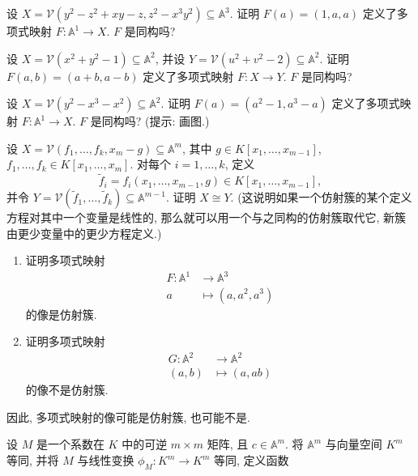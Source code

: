 \BookExerciseHeading
\begin{BookExercises}
  \item\label{ex:polynomial-map-to-two-equation-variety} 设 $X=\mathcal{V}(y^{2}-z^{2}+xy-z,z^{2}-x^{3}y^{2})\subseteq\mathbb{A}^{3}$. 证明 $F(a)=(1,a,a)$ 定义了多项式映射 $F:\mathbb{A}^{1}\to X$. $F$ 是同构吗?
  \item\label{ex:polynomial-map-between-two-circles} 设 $X=\mathcal{V}(x^{2}+y^{2}-1)\subseteq\mathbb{A}^{2}$, 并设 $Y=\mathcal{V}(u^{2}+v^{2}-2)\subseteq\mathbb{A}^{2}$. 证明 $F(a,b)=(a+b,a-b)$ 定义了多项式映射 $F:X\to Y$. $F$ 是同构吗?
  \item\label{ex:polynomial-map-to-nodal-cubic} 设 $X=\mathcal{V}(y^{2}-x^{3}-x^{2})\subseteq\mathbb{A}^{2}$. 证明 $F(a)=(a^{2}-1,a^{3}-a)$ 定义了多项式映射 $F:\mathbb{A}^{1}\to X$. $F$ 是同构吗? (提示: 画图.)
  \item\label{ex:eliminate-a-linear-coordinate} 设 $X=\mathcal{V}(f_{1},\ldots,f_{k},x_{m}-g)\subseteq\mathbb{A}^{m}$, 其中 $g\in K[x_{1},\ldots,x_{m-1}]$, $f_{1},\ldots,f_{k}\in K[x_{1},\ldots,x_{m}]$. 对每个 $i=1,\ldots,k$, 定义
    \[
      \widetilde{f}_{i}=f_{i}(x_{1},\ldots,x_{m-1},g)\in K[x_{1},\ldots,x_{m-1}],
    \]
    并令 $Y=\mathcal{V}(\widetilde{f}_{1},\ldots,\widetilde{f}_{k})\subseteq\mathbb{A}^{m-1}$. 证明 $X\cong Y$. (这说明如果一个仿射簇的某个定义方程对其中一个变量是线性的, 那么就可以用一个与之同构的仿射簇取代它, 新簇由更少变量中的更少方程定义.)
  \item\label{ex:polynomial-image-may-not-be-variety}
    \begin{enumerate}[label=(\alph*)]
      \item 证明多项式映射
        \[
          \begin{aligned}
            F:\mathbb{A}^{1}&\to\mathbb{A}^{3}\\
            a&\mapsto(a,a^{2},a^{3})
          \end{aligned}
        \]
        的像是仿射簇.
      \item 证明多项式映射
        \[
          \begin{aligned}
            G:\mathbb{A}^{2}&\to\mathbb{A}^{2}\\
            (a,b)&\mapsto(a,ab)
          \end{aligned}
        \]
        的像不是仿射簇.
    \end{enumerate}
    因此, 多项式映射的像可能是仿射簇, 也可能不是.
  \item\label{ex:invertible-affine-linear-map} 设 $M$ 是一个系数在 $K$ 中的可逆 $m\times m$ 矩阵, 且 $c\in\mathbb{A}^{m}$. 将 $\mathbb{A}^{m}$ 与向量空间 $K^{m}$ 等同, 并将 $M$ 与线性变换 $\phi_{M}:K^{m}\to K^{m}$ 等同, 定义函数

\end{BookExercises}
